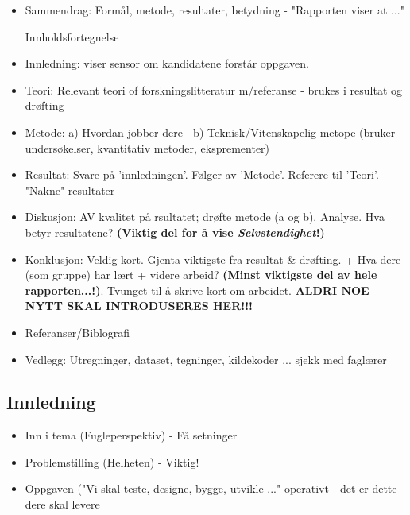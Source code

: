 \begin{itemize}
    \item Sammendrag: Formål, metode, resultater, betydning - "Rapporten viser at ..."

    \itemm Innholdsfortegnelse

    \item Innledning: viser sensor om kandidatene forstår oppgaven.
    
    \item Teori: Relevant teori of forskningslitteratur m/referanse - brukes i resultat og drøfting

    \item Metode: a) Hvordan jobber dere | b) Teknisk/Vitenskapelig metope (bruker undersøkelser, kvantitativ metoder, eksprementer)

    \item Resultat: Svare på 'innledningen'. Følger av 'Metode'. Referere til 'Teori'. "Nakne" resultater

    \item Diskusjon: AV kvalitet på rsultatet; drøfte metode (a og b). Analyse. Hva betyr resultatene? \textbf{(Viktig del for å vise \textit{Selvstendighet}!)}

    \item Konklusjon: Veldig kort. Gjenta viktigste fra resultat \& drøfting. + Hva dere (som gruppe) har lært + videre arbeid? \textbf{(Minst viktigste del av hele rapporten...!)}. Tvunget til å skrive kort om arbeidet. \textbf{ALDRI NOE NYTT SKAL INTRODUSERES HER!!!}

    \item Referanser/Biblografi

    \item Vedlegg: Utregninger, dataset, tegninger, kildekoder ... sjekk med faglærer
\end{itemize}

\subsection*{Innledning}

\begin{itemize}
    \item Inn i tema (Fugleperspektiv) - Få setninger

    \item Problemstilling (Helheten) - Viktig!

    \item Oppgaven ("Vi skal teste, designe, bygge, utvikle ..." operativt - det er dette dere skal levere
\end{itemize}

